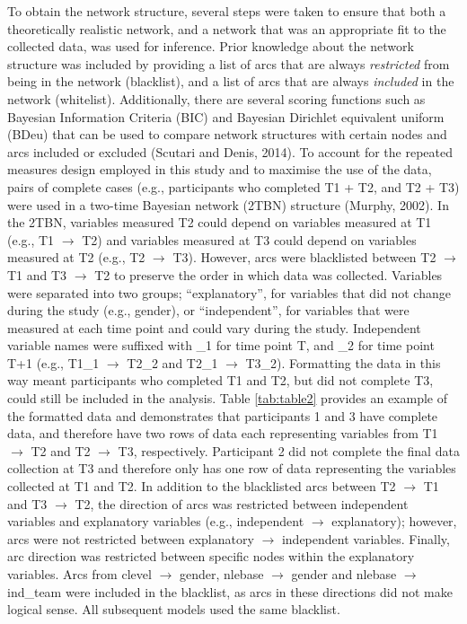 \documentclass[
  english,
  man]{apa6}
\begin{document}
To obtain the network structure, several steps were taken to ensure that both a theoretically realistic network, and a network that was an appropriate fit to the collected data, was used for inference.
Prior knowledge about the network structure was included by providing a list of arcs that are always \emph{restricted} from being in the network (blacklist), and a list of arcs that are always \emph{included} in the network (whitelist).
Additionally, there are several scoring functions such as Bayesian Information Criteria (BIC) and Bayesian Dirichlet equivalent uniform (BDeu) that can be used to compare network structures with certain nodes and arcs included or excluded (Scutari and Denis, 2014).
To account for the repeated measures design employed in this study and to maximise the use of the data, pairs of complete cases (e.g., participants who completed T1 + T2, and T2 + T3) were used in a two-time Bayesian network (2TBN) structure (Murphy, 2002).
In the 2TBN, variables measured T2 could depend on variables measured at T1 (e.g., T1 \(\rightarrow\) T2) and variables measured at T3 could depend on variables measured at T2 (e.g., T2 \(\rightarrow\) T3).
However, arcs were blacklisted between T2 \(\rightarrow\) T1 and T3 \(\rightarrow\) T2 to preserve the order in which data was collected.
Variables were separated into two groups; ``explanatory'', for variables that did not change during the study (e.g., gender), or ``independent'', for variables that were measured at each time point and could vary during the study.
Independent variable names were suffixed with \_1 for time point T, and \_2 for time point T+1 (e.g., T1\_1 \(\rightarrow\) T2\_2 and T2\_1 \(\rightarrow\) T3\_2).
Formatting the data in this way meant participants who completed T1 and T2, but did not complete T3, could still be included in the analysis.
Table \ref{tab:table2} provides an example of the formatted data and demonstrates that participants 1 and 3 have complete data, and therefore have two rows of data each representing variables from T1 \(\rightarrow\) T2 and T2 \(\rightarrow\) T3, respectively.
Participant 2 did not complete the final data collection at T3 and therefore only has one row of data representing the variables collected at T1 and T2.
In addition to the blacklisted arcs between T2 \(\rightarrow\) T1 and T3 \(\rightarrow\) T2, the direction of arcs was restricted between independent variables and explanatory variables (e.g., independent \(\rightarrow\) explanatory); however, arcs were not restricted between explanatory \(\rightarrow\) independent variables.
Finally, arc direction was restricted between specific nodes within the explanatory variables.
Arcs from clevel \(\rightarrow\) gender, nlebase \(\rightarrow\) gender and nlebase \(\rightarrow\) ind\_team were included in the blacklist, as arcs in these directions did not make logical sense.
All subsequent models used the same blacklist.
\end{document}
